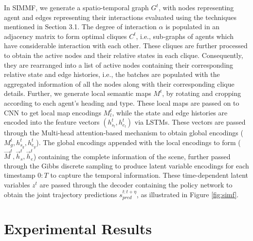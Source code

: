 \documentclass[letterpaper, 10 pt, conference]{ieeeconf}  %
\begin{document}
In SIMMF, we generate a spatio-temporal graph $G^t$, with nodes representing agent and edges representing their interactions evaluated using the techniques mentioned in Section 3.1. The degree of interaction $\alpha$ is populated in an adjacency matrix to form optimal cliques $C^t$, i.e., sub-graphs of agents which have considerable interaction with each other. These cliques are further processed to obtain the active nodes and their relative states in each clique. Consequently, they are rearranged into a list of active nodes containing their corresponding relative state and edge histories, i.e., the batches are populated with the aggregated information of all the nodes along with their corresponding clique details. Further, we generate local semantic maps \cite{caesar2020nuscenes} $M^t$, by rotating and cropping according to each agent's heading and type. These local maps are passed on to CNN to get local map encodings $M_l^t$,  while the state and edge histories are encoded into the feature vectors $(h_{s_l}^t, h_{e_l}^t)$ via LSTMs. These vectors are passed through the Multi-head attention-based mechanism to obtain global encodings  ($M_g^t, h_{s_g}^t, h_{e_g}^t $). The global encodings appended with the local encodings to form ($\vec M^t, \vec h_{s}^t, \vec h_{e}^t $) containing the complete information of the scene, further passed through the Gibbs discrete sampling to produce latent variable encodings for each timestamp $0:T$ to capture the temporal information. These time-dependent latent variables $z^t$ are passed through the decoder containing the policy network to obtain the joint trajectory predictions $s_{pred}^{t:t+\eta}$, as illustrated in Figure \ref{fig:simf}.
\section{Experimental Results}
\end{document}
